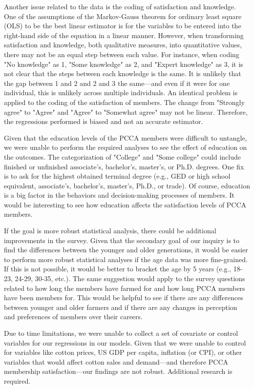 \documentclass[a4paper]{article}
\begin{document}
Another issue related to the data is the coding of satisfaction and knowledge. One of the assumptions of the Markov-Gauss theorem for ordinary least square (OLS) to be the best linear estimator is for the variables to be entered into the right-hand side of the equation in a linear manner. However, when transforming satisfaction and knowledge, both qualitative measures, into quantitative values, there may not be an equal step between each value. For instance, when coding "No knowledge" as 1, "Some knowledge" as 2, and "Expert knowledge" as 3, it is not clear that the steps between each knowledge is the same. It is unlikely that the gap between 1 and 2 and 2 and 3 the same---and even if it were for one individual, this is unlikely across multiple individuals. An identical problem is applied to the coding of the satisfaction of members. The change from "Strongly agree" to "Agree" and "Agree" to "Somewhat agree" may not be linear. Therefore, the regressions performed is biased and not an accurate estimator. 

Given that the education levels of the PCCA members were difficult to untangle, we were unable to perform the required analyses to see the effect of education on the outcomes. The categorization of "College" and "Some college" could include finished or unfinished associate's, bachelor's, master's, or Ph.D. degrees. One fix is to ask for the highest obtained terminal degree (e.g., GED or high school equivalent, associate's, bachelor's, master's, Ph.D., or trade). Of course, education is a big factor in the behaviors and decision-making processes of members. It would be interesting to see how education affects the satisfaction levels of PCCA members.

If the goal is more robust statistical analysis, there could be additional improvements in the survey. Given that the secondary goal of our inquiry is to find the differences between the younger and older generations, it would be easier to perform more robust statistical analyses if the age data was more fine-grained. If this is not possible, it would be better to bracket the age by 5 years (e.g., 18-23, 24-29, 30-35, etc.). The same suggestion would apply to the survey questions related to how long the members have farmed for and how long PCCA members have been members for. This would be helpful to see if there are any differences between younger and older farmers and if there are any changes in perception and preferences of members over their careers. 

Due to time limitations, we were unable to collect a set of covariate or control variables for our regressions in our models. Given that we were unable to control for variables like cotton prices, US GDP per capita, inflation (or CPI), or other variables that would affect cotton sales and demand---and therefore PCCA membership satisfaction---our findings are not robust. Additional research is required.
\end{document}
